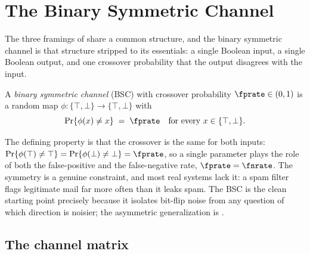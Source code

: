 %
%
%

\section{The Binary Symmetric Channel}
\label{sec:bsc}

The three framings of  share a common structure, and the
binary symmetric channel is that structure stripped to its essentials: a single
Boolean input, a single Boolean output, and one crossover probability that the
output disagrees with the input.

\begin{definition}
\label{def:bsc}
A \emph{binary symmetric channel} (BSC) with
crossover probability $\fprate \in (0, 1)$ is a random map $\phi : \{\top, \bot\} \to \{\top, \bot\}$ with
\[
  \Pr\{\phi(x) \neq x\} \;=\; \fprate
  \quad \text{for every } x \in \{\top, \bot\}.
\]
\end{definition}

The defining property is that the crossover is the same for both inputs:
$\Pr\{\phi(\top) \neq \top\} = \Pr\{\phi(\bot) \neq \bot\} = \fprate$, so a
single parameter plays the role of both the false-positive and the
false-negative rate, $\fprate = \fnrate$. The symmetry is a genuine constraint,
and most real systems lack it: a spam filter flags legitimate mail far more
often than it leaks spam. The BSC is the clean starting point precisely because
it isolates bit-flip noise from any question of which direction is noisier; the
asymmetric generalization is .

\subsection*{The channel matrix}

